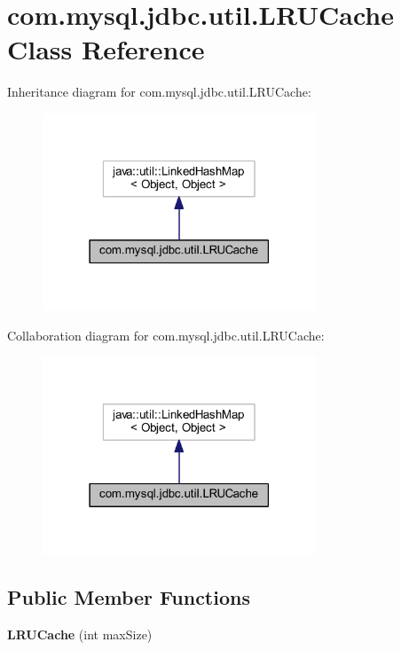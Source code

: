 \hypertarget{classcom_1_1mysql_1_1jdbc_1_1util_1_1_l_r_u_cache}{}\section{com.\+mysql.\+jdbc.\+util.\+L\+R\+U\+Cache Class Reference}
\label{classcom_1_1mysql_1_1jdbc_1_1util_1_1_l_r_u_cache}


Inheritance diagram for com.\+mysql.\+jdbc.\+util.\+L\+R\+U\+Cache\+:
\nopagebreak
\begin{figure}[H]
\begin{center}
\leavevmode
\includegraphics[width=231pt]{classcom_1_1mysql_1_1jdbc_1_1util_1_1_l_r_u_cache__inherit__graph}
\end{center}
\end{figure}


Collaboration diagram for com.\+mysql.\+jdbc.\+util.\+L\+R\+U\+Cache\+:
\nopagebreak
\begin{figure}[H]
\begin{center}
\leavevmode
\includegraphics[width=231pt]{classcom_1_1mysql_1_1jdbc_1_1util_1_1_l_r_u_cache__coll__graph}
\end{center}
\end{figure}
\subsection*{Public Member Functions}
\begin{DoxyCompactItemize}
\item 
\mbox{\label{classcom_1_1mysql_1_1jdbc_1_1util_1_1_l_r_u_cache_ad2d89f479ff1c66f9d540f3a77f1ef0f}} 
{\bfseries L\+R\+U\+Cache} (int max\+Size)
\end{DoxyCompactItemize}
